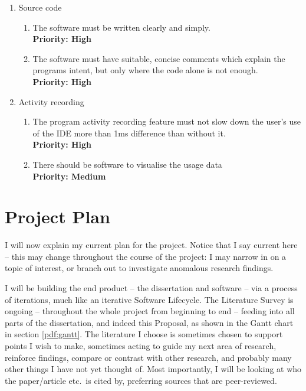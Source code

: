 \begin{enumerate}
  \item Source code
  \label{itm:source}
    \begin{enumerate}
      \item The software must be written clearly and simply.\\
        \textbf{Priority: High}
      \label{itm:source-clear}
      \item The software must have suitable, concise comments which explain the 
            programs intent, but only where the code alone is not enough.\\
        \textbf{Priority: High}
      \label{itm:source-comments}
    \end{enumerate}
  \item Activity recording
  \label{itm:results}
    \begin{enumerate}
      \item The program activity recording feature must not slow down 
	      the user's use of the IDE more than 1ms difference than without
	      it.\\
      \textbf{Priority: High}
      \label{itm:display-equivalent}
      \item There should be software to visualise the usage data\\
      \textbf{Priority: Medium}
      \label{itm:display-und5mins}
    \end{enumerate}
\end{enumerate}

\chapter{Project Plan}

I will now explain my current plan for the project. Notice that I say current
here -- this may change throughout the course of the project: I may narrow in on a
topic of interest, or branch out to investigate anomalous research findings. 

I will be building the end product -- the dissertation and software -- via a
process of iterations, much like an iterative Software Lifecycle. The Literature
Survey is ongoing -- throughout the whole project from beginning to end --
feeding into all parts of the dissertation, and indeed this Proposal, as shown
in the Gantt chart in section \ref{pdf:gantt}. The literature I choose is
sometimes chosen
to support points I wish to make, sometimes acting to guide my next area of research, reinforce findings,
compare or contrast with other research, and probably many other things I have not yet thought
of. Most importantly, I will be looking at who the
paper/article etc.\ is cited by, preferring sources that are peer-reviewed.

